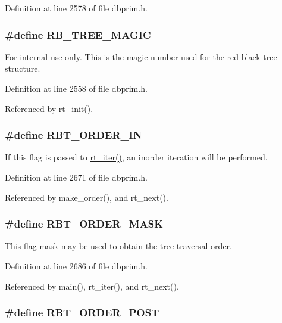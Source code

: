 Definition at line 2578 of file dbprim.h.\hypertarget{group__dbprim__rbtree_ga16}{
\subsubsection[RB\_\-TREE\_\-MAGIC]{\setlength{\rightskip}{0pt plus 5cm}\#define RB\_\-TREE\_\-MAGIC}}
\label{group__dbprim__rbtree_ga16}


\begin{Desc}
\item[For internal use only.]
This is the magic number used for the red-black tree structure.\end{Desc}


Definition at line 2558 of file dbprim.h.

Referenced by rt\_\-init().\hypertarget{group__dbprim__rbtree_ga25}{
\subsubsection[RBT\_\-ORDER\_\-IN]{\setlength{\rightskip}{0pt plus 5cm}\#define RBT\_\-ORDER\_\-IN}}
\label{group__dbprim__rbtree_ga25}


If this flag is passed to \hyperlink{group__dbprim__rbtree_ga11}{rt\_\-iter()}, an inorder iteration will be performed.

Definition at line 2671 of file dbprim.h.

Referenced by make\_\-order(), and rt\_\-next().\hypertarget{group__dbprim__rbtree_ga27}{
\subsubsection[RBT\_\-ORDER\_\-MASK]{\setlength{\rightskip}{0pt plus 5cm}\#define RBT\_\-ORDER\_\-MASK}}
\label{group__dbprim__rbtree_ga27}


This flag mask may be used to obtain the tree traversal order.

Definition at line 2686 of file dbprim.h.

Referenced by main(), rt\_\-iter(), and rt\_\-next().\hypertarget{group__dbprim__rbtree_ga26}{
\subsubsection[RBT\_\-ORDER\_\-POST]{\setlength{\rightskip}{0pt plus 5cm}\#define RBT\_\-ORDER\_\-POST}}
\label{group__dbprim__rbtree_ga26}


